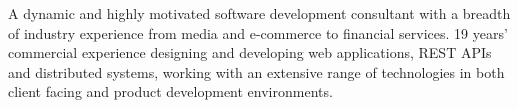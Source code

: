 

\begin{cvparagraph}

A dynamic and highly motivated software development consultant with a breadth of industry experience from media and e-commerce to financial services. 19 years' commercial experience designing and developing web applications, REST APIs and distributed systems, working with an extensive range of technologies in both client facing and product development environments.
\end{cvparagraph}
